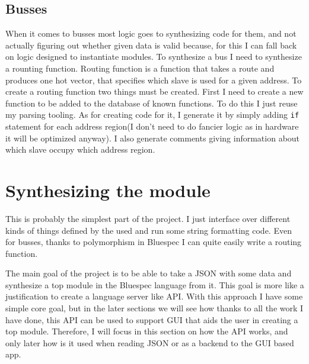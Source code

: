 \documentclass[14pt]{report}
\begin{document}
\subsection{Busses}
When it comes to busses most logic goes to synthesizing code for them, and not actually figuring out whether given data is valid because, for this I can fall back on logic designed to instantiate modules. To synthesize a bus I need to synthesize a rounting function.
Routing function is a function that takes a route and produces one hot vector, that specifies which slave is used for a given address. 
To create a routing function two things must be created. First I need to create a new function to be added to the database of known functions. To do this I just reuse my parsing tooling. As for creating code for it, I generate it by simply adding \verb!if! statement for each address region(I don't need to do fancier logic as in hardware it will be optimized anyway). I also generate comments giving information about which slave occupy which address region.

\section{Synthesizing the module}
This is probably the simplest part of the project. I just interface over different kinds of things defined by the used and run some string formatting code. Even for busses, thanks to polymorphism in Bluespec I can quite easily write a routing function.


The main goal of the project is to be able to take a JSON with some data and synthesize a top module in the Bluespec language from it. This goal is more like a justification to create a language server like API. With this approach I have some simple core goal, but in the later sections we will see how thanks to all the work I have done, this API can be used to support GUI that aids the user in creating a top module. Therefore, I will focus in this section on how the API works, and only later how is it used when reading JSON or as a backend to the GUI based app.
\end{document}
